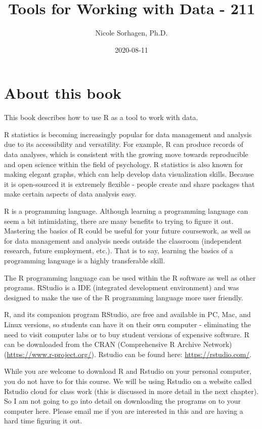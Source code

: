 \documentclass[
]{book}
\title{Tools for Working with Data - 211}
\author{Nicole Sorhagen, Ph.D.}
\date{2020-08-11}
\begin{document}
\maketitle

{
\setcounter{tocdepth}{1}
\tableofcontents
}
\hypertarget{about-this-book}{%
\chapter{About this book}\label{about-this-book}}

This book describes how to use R as a tool to work with data.

R statistics is becoming increasingly popular for data management and analysis due to its accessibility and versatility. For example, R can produce records of data analyses, which is consistent with the growing move towards reproducible and open science within the field of psychology. R statistics is also known for making elegant graphs, which can help develop data visualization skills. Because it is open-sourced it is extremely flexible - people create and share packages that make certain aspects of data analysis easy.

R is a programming language. Although learning a programming language can seem a bit intimidating, there are many benefits to trying to figure it out. Mastering the basics of R could be useful for your future coursework, as well as for data management and analysis needs outside the classroom (independent research, future employment, etc.). That is to say, learning the basics of a programming language is a highly transferable skill.

The R programming language can be used within the R software as well as other programs. RStudio is a IDE (integrated development environment) and was designed to make the use of the R programming language more user friendly.

R, and its companion program RStudio, are free and available in PC, Mac, and Linux versions, so students can have it on their own computer - eliminating the need to visit computer labs or to buy student versions of expensive software. R can be downloaded from the CRAN (Comprehensive R Archive Network) (\url{https://www.r-project.org/}). Rstudio can be found here: \url{https://rstudio.com/}.

While you are welcome to download R and Rstudio on your personal computer, you do not have to for this course. We will be using Rstudio on a website called Rstudio cloud for class work (this is discussed in more detail in the next chapter). So I am not going to go into detail on downloading the programs on to your computer here. Please email me if you are interested in this and are having a hard time figuring it out.
\end{document}

